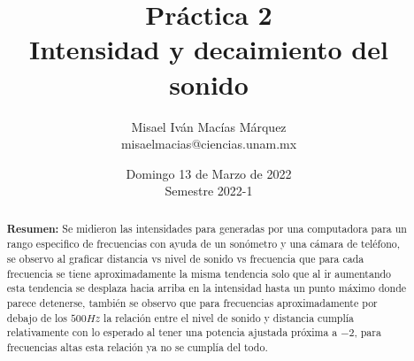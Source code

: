 \documentclass[DIV=calc, paper=a4, fontsize=11pt]{scrartcl}
\title{Práctica 2\\ %
Intensidad y decaimiento del sonido} %
\author{Misael Iván Macías Márquez\\
misaelmacias@ciencias.unam.mx}
\date{Domingo 13 de Marzo de 2022\\Semestre 2022-1}
\begin{document}
\maketitle


\begin{abstract}
\textbf{Resumen:} Se midieron las intensidades para generadas por una computadora para un rango especifico de frecuencias con ayuda de un sonómetro y una cámara de teléfono, se observo al graficar distancia vs nivel de sonido vs frecuencia que para cada frecuencia se tiene aproximadamente la misma tendencia solo que al ir aumentando esta tendencia se desplaza hacia arriba en la intensidad hasta un punto máximo donde parece detenerse, también se observo que para frecuencias aproximadamente por debajo de los $500Hz$ la relación entre el nivel de sonido y distancia cumplía relativamente con lo esperado al tener una potencia ajustada próxima a $-2$, para frecuencias altas esta relación ya no se cumplía del todo.


\end{abstract}
\end{document}
